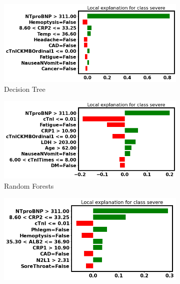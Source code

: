 \begin{figure}
\centering
\begin{subfigure}[b]{0.45\textwidth}
    \centering
    \includegraphics[width=\textwidth]{figures/chapter_interp/lime_dt_5.png}
    \caption{Decision Tree}
    \label{fig:lime_dt_5}
\end{subfigure}
\hfill
\begin{subfigure}[b]{0.45\textwidth}
    \centering
    \includegraphics[width=\textwidth]{figures/chapter_interp/lime_rf_5.png}
    \caption{Random Forests}
    \label{fig:lime_rf_5}
\end{subfigure}
\hfill
\begin{subfigure}[b]{0.45\textwidth}
    \centering
    \includegraphics[width=\textwidth]{figures/chapter_interp/lime_xgbc_5.png}

\end{subfigure}
\end{figure}
